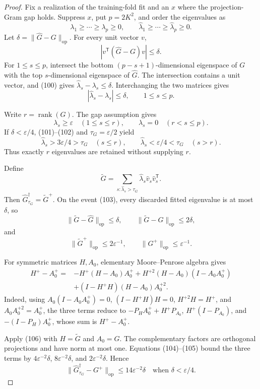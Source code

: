 \documentclass{article}
\begin{document}
\begin{proof}
Fix a realization of the training-fold fit and an \(x\) where the projection-Gram gap holds.  Suppress \(x\), put \(p=2K^2\), and order the eigenvalues as
\[
 \lambda_1\geq\cdots\geq\lambda_p\geq0,\qquad
 \widehat\lambda_1\geq\cdots\geq\widehat\lambda_p\geq0.
\]
Let \(\delta=\|\widehat G-G\|_{\mathrm{op}}\).  For every unit vector \(v\),
\[
 |v^{\mathsf T}(\widehat G-G)v|\leq\delta. \tag{100}
\]
For \(1\leq s\leq p\), intersect the bottom \((p-s+1)\)-dimensional eigenspace of \(G\) with the top \(s\)-dimensional eigenspace of \(\widehat G\).  The intersection contains a unit vector, and (100) gives
\(\widehat\lambda_s-\lambda_s\leq\delta\).  Interchanging the two matrices gives
\[
 |\widehat\lambda_s-\lambda_s|\leq\delta,\qquad 1\leq s\leq p. \tag{101}
\]

Write \(r=\operatorname{rank}(G)\).  The gap assumption gives
\[
 \lambda_s\geq\varepsilon\quad(1\leq s\leq r),\qquad
 \lambda_s=0\quad(r<s\leq p). \tag{102}
\]
If \(\delta<\varepsilon/4\), (101)--(102) and \(\tau_G=\varepsilon/2\) yield
\[
 \widehat\lambda_s>3\varepsilon/4>\tau_G\quad(s\leq r),\qquad
 \widehat\lambda_s<\varepsilon/4<\tau_G\quad(s>r). \tag{103}
\]
Thus exactly \(r\) eigenvalues are retained without supplying \(r\).

Define
\[
 \widetilde G=\sum_{s:\widehat\lambda_s>\tau_G}
 \widehat\lambda_s\widehat v_s\widehat v_s^{\mathsf T}.
\]
Then \(\widehat G_{\tau_G}^{\dagger}=\widetilde G^+\).  On the event (103), every discarded fitted eigenvalue is at most \(\delta\), so
\[
 \|\widetilde G-\widehat G\|_{\mathrm{op}}\leq\delta,\qquad
 \|\widetilde G-G\|_{\mathrm{op}}\leq2\delta, \tag{104}
\]
and
\[
 \|\widetilde G^+\|_{\mathrm{op}}\leq2\varepsilon^{-1},\qquad
 \|G^+\|_{\mathrm{op}}\leq\varepsilon^{-1}. \tag{105}
\]

For symmetric matrices \(H,A_0\), elementary Moore--Penrose algebra gives
\[
\begin{aligned}
 H^+-A_0^+
={}&-H^+(H-A_0)A_0^+
 +H^{+2}(H-A_0)(I-A_0A_0^+)\\
&+(I-H^+H)(H-A_0)A_0^{+2}. \tag{106}
\end{aligned}
\]
Indeed, using \(A_0(I-A_0A_0^+)=0\), \((I-H^+H)H=0\),
\(H^{+2}H=H^+\), and \(A_0A_0^{+2}=A_0^+\), the three terms reduce to
\(-P_HA_0^++H^+P_{A_0}\), \(H^+(I-P_{A_0})\), and
\(-(I-P_H)A_0^+\), whose sum is \(H^+-A_0^+\).

Apply (106) with \(H=\widetilde G\) and \(A_0=G\).  The complementary factors are orthogonal projections and have norm at most one.  Equations (104)--(105) bound the three terms by \(4\varepsilon^{-2}\delta\), \(8\varepsilon^{-2}\delta\), and \(2\varepsilon^{-2}\delta\).  Hence
\[
 \|\widehat G_{\tau_G}^{\dagger}-G^+\|_{\mathrm{op}}
 \leq14\varepsilon^{-2}\delta
 \quad\text{when }\delta<\varepsilon/4. \tag{107}
\]


\end{proof}
\end{document}
